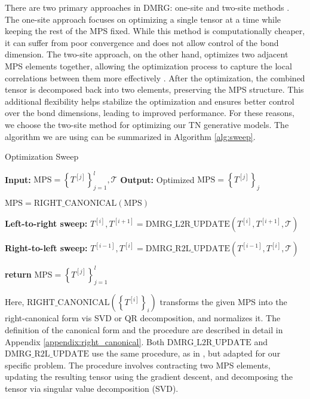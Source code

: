 There are two primary approaches in DMRG: one-site \cite{PhysRevB.72.180403} and two-site methods \cite{SCHOLLWOCK201196}. The one-site approach focuses on optimizing a single tensor at a time while keeping the rest of the MPS fixed. While this method is computationally cheaper, it can suffer from poor convergence and does not allow control of the bond dimension. The two-site approach, on the other hand, optimizes two adjacent MPS elements together, allowing the optimization process to capture the local correlations between them more effectively \cite{SCHOLLWOCK201196}. After the optimization, the combined tensor is decomposed back into two elements, preserving the MPS structure. This additional flexibility helps stabilize the optimization and ensures better control over the bond dimensions, leading to improved performance. For these reasons, we choose the two-site method for optimizing our TN generative models.
The algorithm we are using can be summarized in Algorithm \ref{alg:sweep}. 

\begin{algorithm}
\caption{Optimization Sweep}
\begin{algorithmic}[1]
\STATE \textbf{Input:} $\text{MPS}=\left\{T^{[j]}\right\}_{j=1}^l, \mathcal T$
\STATE \textbf{Output:} Optimized $\text{MPS}=\left\{T^{[j]}\right\}_j$

\STATE $\text{MPS} = \text{RIGHT\_CANONICAL}\left(\text{MPS}\right)$

\STATE \textbf{Left-to-right sweep:}
    \STATE $T^{[i]}, T^{[i+1]} =  \text{DMRG\_L2R\_UPDATE}\left(T^{[i]}, T^{[i+1]}, \mathcal T\right)$
    
\ENDFOR

\STATE \textbf{Right-to-left sweep:}
    \STATE $T^{[i-1]}, T^{[i]} =  \text{DMRG\_R2L\_UPDATE}\left(T^{[i-1]}, T^{[i]}, \mathcal T\right)$
\ENDFOR

\STATE \textbf{return} $\text{MPS}=\left\{T^{[j]}\right\}_{j=1}^l$

\end{algorithmic}\label{alg:sweep}
\end{algorithm}

Here, $\text{RIGHT\_CANONICAL}\left(\left\{T^{[i]}\right\}_i\right)$ transforms the given MPS into the right-canonical \cite{SCHOLLWOCK201196} form vis SVD or QR decomposition, and normalizes it. The definition of the canonical form and the procedure are described in detail in Appendix \ref{appendix:right_canonical}. Both $\text{DMRG\_L2R\_UPDATE}$ and $\text{DMRG\_R2L\_UPDATE}$ use the same procedure, as in \cite{lopezpiqueres2023symmetric}, but adapted for our specific problem. The procedure involves contracting two MPS elements, updating the resulting tensor using the gradient descent, and decomposing the tensor via singular value decomposition (SVD).

